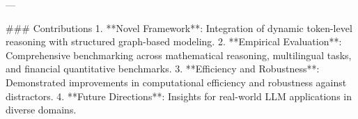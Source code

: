---

### Contributions  
1. **Novel Framework**: Integration of dynamic token-level reasoning with structured graph-based modeling.  
2. **Empirical Evaluation**: Comprehensive benchmarking across mathematical reasoning, multilingual tasks, and financial quantitative benchmarks.  
3. **Efficiency and Robustness**: Demonstrated improvements in computational efficiency and robustness against distractors.  
4. **Future Directions**: Insights for real-world LLM applications in diverse domains.


